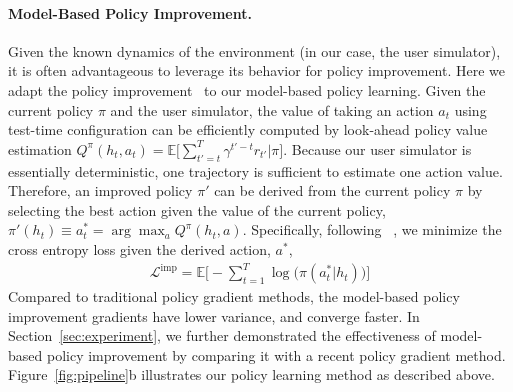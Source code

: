 \paragraph{Model-Based Policy Improvement.}  
\label{sec:optimization}
Given the known dynamics of the environment (in our case, the user simulator), it is often
advantageous to leverage its behavior for policy improvement. Here we adapt the policy improvement~\cite{sutton1998reinforcement} to our model-based policy learning.
Given the current policy $\pi$ and the user simulator, the value
of taking an action $a_{t}$ using test-time configuration can be efficiently 
computed by look-ahead policy value estimation 
$Q^{\pi}(h_{t}, a_{t}) = \mathbb{E} \big[ \sum_{t'=t}^{T} \gamma^{t'-t} r_{t'} | \pi \big]$. Because our user simulator is essentially deterministic, one trajectory 
is sufficient to estimate one action value.
Therefore, an improved policy $\pi'$ can be derived from the current policy $\pi$ 
by selecting the best action given the value of the current policy, $\pi'(h_{t}) \equiv a^{*}_{t} = \arg \max_{a} Q^{\pi}(h_{t}, a)$. 
Specifically, following ~\cite{guo2014deep}, we minimize the cross entropy loss given 
the derived action, $a^{*}$,
\begin{equation}
\begin{aligned}
\mathcal{L}^{\textrm{imp}} = \mathbb{E} \Big[ - \sum_{t=1}^{T} \log\Big(\pi(a^{*}_{t}|h_{t})\Big)\Big]
\end{aligned}
\end{equation}
Compared to traditional policy gradient methods, the model-based policy improvement gradients have lower variance, and converge faster. In Section~\ref{sec:experiment}, we further demonstrated the effectiveness of model-based policy improvement by comparing it
with a recent policy gradient method. Figure~\ref{fig:pipeline}b illustrates our policy learning method as described above.
 
\begin{comment}
Given the self-critical policy gradient defined in Equation~\ref{eq:critical}, 
the final gradient update formulation is:
\begin{equation}
\begin{aligned}
\nabla_{\theta} \mathcal{U} =\mathbb{E} \big[ (u(h_{T}) - u(\hat{h}_{T})) \sum_{t=1}^{T} \nabla_{\theta} \log\big(\pi(a^{*}_{t}| h_{t})\big)\big]
\end{aligned}
\label{eq:critical}
\end{equation}
\end{comment}
\nocite{li2014req}


